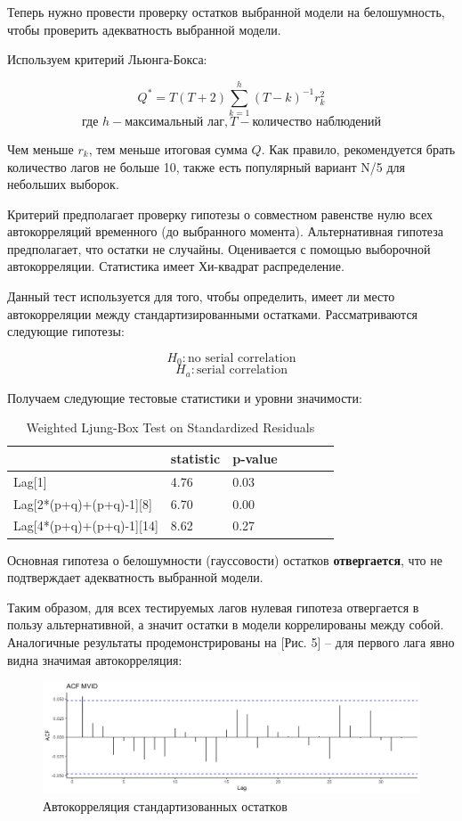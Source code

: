 \documentclass[a4paper,12pt,twoside]{article}
\begin{document}
Теперь нужно провести проверку остатков выбранной модели на белошумность, чтобы проверить адекватность выбранной модели.

Используем критерий Льюнга-Бокса:

$$Q^* = T(T+2) \sum_{k=1}^h (T-k)^{-1}r_k^2$$
$$\text{где } h - \text{максимальный лаг},  T - \text{количество наблюдений}$$

Чем меньше $r_k$, тем меньше итоговая сумма $Q$.
Как правило, рекомендуется брать количество лагов не больше 10, также есть популярный вариант N/5 для небольших выборок.

Критерий предполагает проверку гипотезы о совместном равенстве нулю всех автокорреляций временного (до выбранного момента).
Альтернативная гипотеза предполагает, что остатки не случайны.
Оценивается с помощью выборочной автокорреляции.
Статистика имеет Хи-квадрат распределение.


Данный тест используется для того, чтобы определить, имеет ли место автокорреляции между стандартизированными остатками. Рассматриваются следующие гипотезы:

$$
H_0: \text{no serial correlation}
$$
$$
H_a: \text{serial correlation}
$$

Получаем следующие тестовые статистики и уровни значимости:

\begin{table}[!h]
\centering
\begin{tabular}{lllllll}
  \hline
          &  statistic  &  p-value  \\
  \hline
  Lag[1]  & 4.76 & 0.03 \\
  Lag[2*(p+q)+(p+q)-1][8]  & 6.70 &  0.00 \\
  Lag[4*(p+q)+(p+q)-1][14]  & 8.62 &  0.27 \\
  \hline
\end{tabular}
\caption{Weighted Ljung-Box Test on Standardized Residuals}
\end{table}

Основная гипотеза о белошумности (гауссовости) остатков \textbf{отвергается}, что не подтверждает адекватность выбранной модели.

Таким образом, для всех тестируемых лагов нулевая гипотеза отвергается в пользу альтернативной, а значит остатки в модели коррелированы между собой.
Аналогичные результаты продемонстрированы на [Рис. 5] – для первого лага явно видна значимая автокорреляция:

\begin{figure}[!h]
    \includegraphics[scale = 0.45]{mvideo_4.png}
    \caption{Автокорреляция стандартизованных остатков}
    \label{fig:mvideo_04}
\end{figure}
\end{document}

